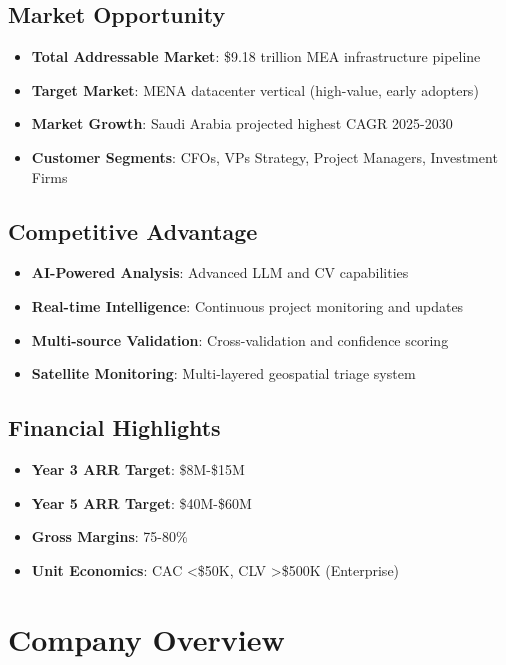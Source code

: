 \documentclass[business]{../templates/infraradar-main}
\begin{document}
\subsection{Market Opportunity}
\begin{itemize}
    \item \textbf{Total Addressable Market}: \$9.18 trillion MEA infrastructure pipeline
    \item \textbf{Target Market}: MENA datacenter vertical (high-value, early adopters)
    \item \textbf{Market Growth}: Saudi Arabia projected highest CAGR 2025-2030
    \item \textbf{Customer Segments}: CFOs, VPs Strategy, Project Managers, Investment Firms
\end{itemize}

\subsection{Competitive Advantage}
\begin{itemize}
    \item \textbf{AI-Powered Analysis}: Advanced LLM and CV capabilities
    \item \textbf{Real-time Intelligence}: Continuous project monitoring and updates
    \item \textbf{Multi-source Validation}: Cross-validation and confidence scoring
    \item \textbf{Satellite Monitoring}: Multi-layered geospatial triage system
\end{itemize}

\subsection{Financial Highlights}
\begin{itemize}
    \item \textbf{Year 3 ARR Target}: \$8M-\$15M
    \item \textbf{Year 5 ARR Target}: \$40M-\$60M
    \item \textbf{Gross Margins}: 75-80\%
    \item \textbf{Unit Economics}: CAC <\$50K, CLV >\$500K (Enterprise)
\end{itemize}

\section{Company Overview}
\end{document}
